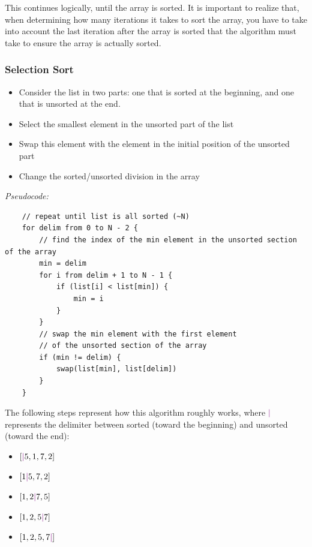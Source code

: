 \documentclass[12pt]{article}
\begin{document}
This continues logically, until the array is sorted. It is important to realize that, when determining how many iterations it takes to sort the array, you have to take into account the last iteration after the array is sorted that the algorithm must take to ensure the array is actually sorted.

\subsubsection{Selection Sort}
\begin{itemize}
    \item Consider the list in two parts: one that is sorted at the beginning, and one that is unsorted at the end.
    \item Select the smallest element in the unsorted part of the list
    \item Swap this element with the element in the initial position of the unsorted part
    \item Change the sorted/unsorted division in the array
\end{itemize}

\textit{Pseudocode:}

\begin{verbatim}
    // repeat until list is all sorted (~N)
    for delim from 0 to N - 2 {
        // find the index of the min element in the unsorted section of the array
        min = delim
        for i from delim + 1 to N - 1 {
            if (list[i] < list[min]) {
                min = i
            }
        }
        // swap the min element with the first element 
        // of the unsorted section of the array
        if (min != delim) {
            swap(list[min], list[delim])
        }
    }
\end{verbatim}

\newcommand{\blue}[1]{\textcolor{violet}{#1}}

The following steps represent how this algorithm roughly works, where $\blue{|}$ represents the delimiter between sorted (toward the beginning) and unsorted (toward the end):

\begin{itemize}
    \item $[\blue{|}5,1,7,2]$
    \item $[1\blue{|}5,7,2]$
    \item $[1,2\blue{|}7,5]$
    \item $[1,2,5\blue{|}7]$
    \item $[1,2,5,7\blue{|}]$
\end{itemize}
\end{document}
